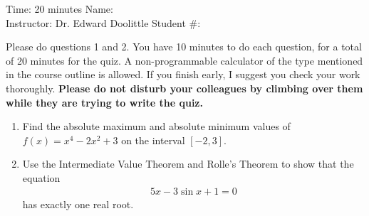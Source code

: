 \documentclass[12pt]{article}
\begin{document}
\thispagestyle{plain}

\begin{flushleft}
Time:  20 minutes                \hfill       Name: \underline{\hspace{2in}} \\
Instructor: Dr. Edward Doolittle \hfill Student \#: \underline{\hspace{2in}}
\end{flushleft}

\noindent
Please do questions 1 and 2.  You have 10 minutes
to do each question, for a total of 20
minutes for the quiz.  A non-programmable
calculator of the type mentioned in the course outline is allowed.
If you finish early, I suggest you check your work thoroughly.
\textbf{Please do not disturb your colleagues by climbing over them while
they are trying to write the quiz.}

\begin{enumerate}
\item Find 
  the absolute maximum and absolute minimum values of $f(x)=x^4-2x^2+3$
  on the interval $[-2,3]$.
\newpage
\item Use
  the Intermediate Value Theorem and Rolle's Theorem to show
  that the equation 
  \begin{align*}
    5x-3\sin x+1=0
  \end{align*}
  has exactly one real root.
\end{enumerate}
\end{document}
